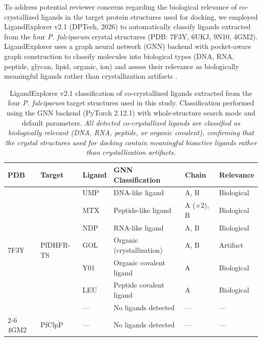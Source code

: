 \documentclass[journal=jcisd8,manuscript=suppinfo]{achemso}
\begin{document}
To address potential reviewer concerns regarding the biological relevance of co-crystallized ligands in the target protein structures used for docking, we employed LigandExplorer v2.1 (DPTech, 2026) to automatically classify ligands extracted from the four \textit{P. falciparum} crystal structures (PDB: 7F3Y, 6UKJ, 9N10, 4GM2). LigandExplorer uses a graph neural network (GNN) backend with pocket-aware graph construction to classify molecules into biological types (DNA, RNA, peptide, glycan, lipid, organic, ion) and assess their relevance as biologically meaningful ligands rather than crystallization artifacts \cite{Li2026LigandExplorer}.

\begin{table}[htbp]
\centering
\caption{LigandExplorer v2.1 classification of co-crystallized ligands extracted from the four \textit{P. falciparum} target structures used in this study. Classification performed using the GNN backend (PyTorch 2.12.1) with whole-structure search mode and default parameters. \textit{All detected co-crystallized ligands are classified as biologically relevant (DNA, RNA, peptide, or organic covalent), confirming that the crystal structures used for docking contain meaningful bioactive ligands rather than crystallization artifacts.}}
\label{tab:sm_ligandexplorer}
\small
\begin{tabular}{@{}l l l l l l@{}}
\toprule
\textbf{PDB} & \textbf{Target} & \textbf{Ligand} & \textbf{GNN Classification} & \textbf{Chain} & \textbf{Relevance} \\
\midrule
\multirow{7}{*}{7F3Y} & \multirow{7}{*}{PfDHFR-TS} & UMP & DNA-like ligand & A, B & Biological \\
& & MTX & Peptide-like ligand & A ($\times$2), B & Biological \\
& & NDP & RNA-like ligand & A, B & Biological \\
& & GOL & Organic (crystallization) & A, B & Artifact \\
\cmidrule{2-6}
\multirow{2}{*}{6UKJ} & \multirow{2}{*}{PfCRT} & Y01 & Organic covalent ligand & A & Biological \\
& & LEU & Peptide covalent ligand & A & Biological \\
\cmidrule{2-6}
9N10 & PfATP4 & --- & No ligands detected & --- & --- \\
\cmidrule{2-6}
4GM2 & PfClpP & --- & No ligands detected & --- & --- \\
\bottomrule
\end{tabular}
\vspace{0.3em}

\end{table}
\end{document}
